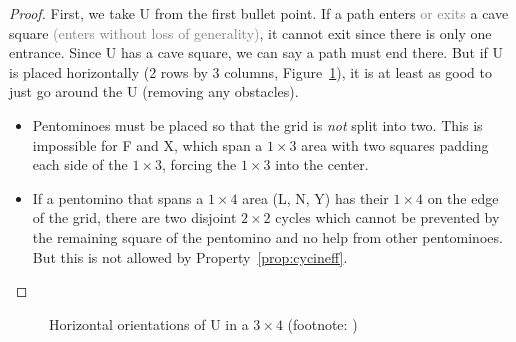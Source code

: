 \documentclass{article}
\theoremstyle{definition}%
\newcommand{\minordetail}[1]{\textcolor{gray}{#1}}
\begin{document}
\begin{proof}
First, we take U from the first bullet point. If a path enters \minordetail{or exits} a cave square \minordetail{(enters without loss of generality)}, it cannot exit since there is only one entrance. Since U has a cave square, we can say a path must end there. But if U is placed horizontally (2 rows by 3 columns, Figure~\ref{fig:u3x4}), it is at least as good to just go around the U (removing any obstacles).
\begin{itemize}
    \item Pentominoes must be placed so that the grid is \emph{not} split into two. This is impossible for F and X, which span a $1 \times 3$ area with two squares padding each side of the $1 \times 3$, forcing the $1 \times 3$ into the center.
    \item If a pentomino that spans a $1 \times 4$ area (L, N, Y) has their $1 \times 4$ on the edge of the grid, there are two disjoint $2 \times 2$ cycles which cannot be prevented by the remaining square of the pentomino and no help from other pentominoes. But this is not allowed by Property~\ref{prop:cycineff}.\qedhere
\end{itemize}
\end{proof}

\begin{figure}
    \centering
    \caption{Horizontal orientations of U in a $3 \times 4$ (footnote: \protect\footnotemark)}
    \label{fig:u3x4}
\end{figure}

\end{document}
